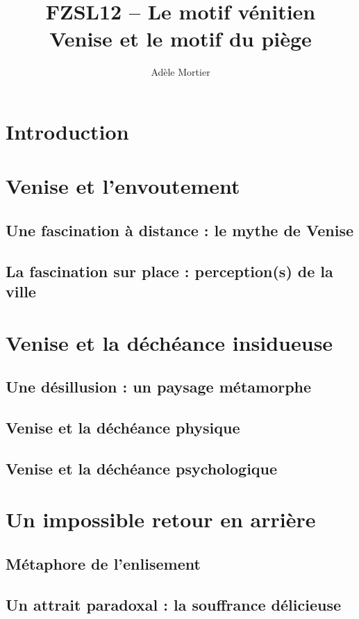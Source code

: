 \documentclass[a4paper,10pt]{article}
\title{FZSL12 -- Le motif vénitien\\
	Venise et le motif du piège}
\author{Adèle Mortier}
\begin{document}
\maketitle

\section*{Introduction}
\section{Venise et l'envoutement}
	\subsection{Une fascination à distance : le mythe de Venise}
	\subsection{La fascination sur place : perception(s) de la ville}
\section{Venise et la déchéance insidueuse}
	\subsection{Une désillusion : un paysage métamorphe}
	\subsection{Venise et la déchéance physique}
	\subsection{Venise et la déchéance psychologique}
\section{Un impossible retour en arrière}
	\subsection{Métaphore de l'enlisement}
	\subsection{Un attrait paradoxal : la souffrance délicieuse}
\medskip


\end{document}

